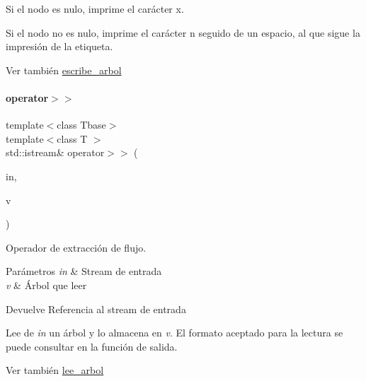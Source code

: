 \begin{DoxyItemize}
\item Si el nodo es nulo, imprime el carácter \textquotesingle{}x\textquotesingle{}.
\item Si el nodo no es nulo, imprime el carácter \textquotesingle{}n\textquotesingle{} seguido de un espacio, al que sigue la impresión de la etiqueta.
\end{DoxyItemize}

\begin{DoxySeeAlso}{Ver también}
\hyperlink{classArbolGeneral_abac6b7ce1205ab23ad535a431e3038c7}{escribe\+\_\+arbol} 
\end{DoxySeeAlso}
\hypertarget{classArbolGeneral_ab1318141f030856da7dcfc1c7a162565}{}\label{classArbolGeneral_ab1318141f030856da7dcfc1c7a162565} 
\paragraph{\texorpdfstring{operator$>$$>$}{operator>>}}
{\footnotesize\ttfamily template$<$class Tbase$>$ \\
template$<$class T $>$ \\
std\+::istream\& operator$>$$>$ (\begin{DoxyParamCaption}\item[{std\+::istream \&}]{in,  }\item[{\hyperlink{classArbolGeneral}{Arbol\+General}$<$ T $>$ \&}]{v }\end{DoxyParamCaption})\hspace{0.3cm}{\ttfamily [friend]}}



Operador de extracción de flujo. 


\begin{DoxyParams}{Parámetros}
{\em in} & Stream de entrada \\
\hline
{\em v} & Árbol que leer \\
\hline
\end{DoxyParams}
\begin{DoxyReturn}{Devuelve}
Referencia al stream de entrada
\end{DoxyReturn}
Lee de {\itshape in} un árbol y lo almacena en {\itshape v}. El formato aceptado para la lectura se puede consultar en la función de salida. \begin{DoxySeeAlso}{Ver también}
\hyperlink{classArbolGeneral_a73927127a9f5c4e96eccb615ee09077a}{lee\+\_\+arbol} 
\end{DoxySeeAlso}


